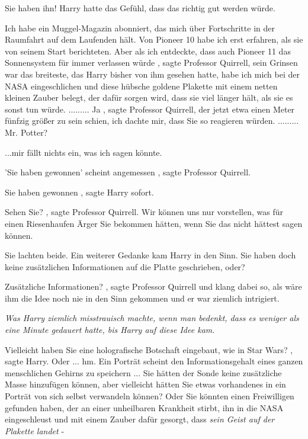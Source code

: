 \glqq Sie haben ihn!\grqq{} Harry hatte das Gefühl, dass das richtig gut werden
würde.

\glqq Ich habe ein Muggel-Magazin abonniert, das mich über Fortschritte in der
Raumfahrt auf dem Laufenden hält. Von Pioneer 10 habe ich erst erfahren, als sie
von seinem Start berichteten. Aber als ich entdeckte, dass auch Pioneer 11 das
Sonnensystem für immer verlassen würde\grqq{} , sagte Professor Quirrell, sein
Grinsen war das breiteste, das Harry bisher von ihm gesehen hatte, \glqq habe
ich mich bei der NASA eingeschlichen und diese hübsche goldene Plakette mit
einem netten kleinen Zauber belegt, der dafür sorgen wird, dass sie viel länger
hält, als sie es sonst tun würde. \glqq ......... \glqq Ja\grqq{} , sagte
Professor Quirrell, der jetzt etwa einen Meter fünfzig größer zu sein schien,
\glqq ich dachte mir, dass Sie so reagieren würden.\grqq{} ......... \glqq Mr.
Potter?\grqq{}

\glqq ...mir fällt nichts ein, was ich sagen könnte.\grqq{}

\glqq 'Sie haben gewonnen' scheint angemessen\grqq{} , sagte Professor Quirrell.

\glqq Sie haben gewonnen\grqq{} , sagte Harry sofort.

\glqq Sehen Sie?\grqq{} , sagte Professor Quirrell. \glqq Wir können uns nur
vorstellen, was für einen Riesenhaufen Ärger Sie bekommen hätten, wenn Sie das
nicht hättest sagen können.\grqq{}

Sie lachten beide. Ein weiterer Gedanke kam Harry in den Sinn. \glqq Sie haben
doch keine zusätzlichen Informationen auf die Platte geschrieben, oder?\grqq{}

\glqq Zusätzliche Informationen?\grqq{} , sagte Professor Quirrell und klang
dabei so, als wäre ihm die Idee noch nie in den Sinn gekommen und er war
ziemlich intrigiert.

\emph{Was Harry ziemlich misstrauisch machte, wenn man bedenkt, dass es weniger
als eine Minute gedauert hatte, bis Harry auf diese Idee kam. }

\glqq Vielleicht haben Sie eine holografische Botschaft eingebaut, wie in Star
Wars?\grqq{} , sagte Harry. \glqq Oder ... hm. Ein Porträt scheint den
Informationsgehalt eines ganzen menschlichen Gehirns zu speichern ... Sie hätten
der Sonde keine zusätzliche Masse hinzufügen können, aber vielleicht hätten Sie
etwas vorhandenes in ein Porträt von sich selbst verwandeln können? Oder Sie
könnten einen Freiwilligen gefunden haben, der an einer unheilbaren Krankheit
stirbt, ihn in die NASA eingeschleust und mit einem Zauber dafür gesorgt,
dass\emph{ sein Geist auf der Plakette landet} -\grqq{}


